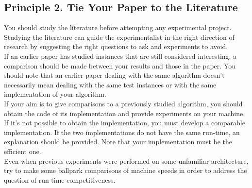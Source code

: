 \documentclass[]{scrartcl}
\begin{document}
\subsection*{Principle 2. Tie Your Paper to the Literature}
You should study the literature before attempting any experimental project. Studying the literature can guide the experimentalist in the right direction of research by suggesting the right questions to ask and experiments to avoid. \\ If an earlier paper has studied instances that are still considered interesting, a comparison should be made between your results and those in the paper. You should note that an earlier paper dealing with the same algorithm doesn't necessarily mean dealing with the same test instances or with the same implementation of your algorithm. \\ If your aim is to give comparisons to a previously studied algorithm, you should obtain the code of its implementation and provide experiments on your machine. \\ If it's not possible to obtain the implementation, you must develop a comparable implementation. If the two implementations do not have the same run-time, an explanation should be provided. Note that your implementation must be the efficient one. \\ Even when previous experiments were performed on some unfamiliar architecture, try to make some ballpark comparisons of machine speeds in order to address the question of run-time competitiveness.
\end{document}
